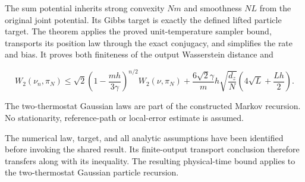 \documentclass[11pt,a4paper]{article}
\begin{document}
The sum potential inherits strong convexity \(Nm\) and smoothness \(NL\) from the original joint potential. Its Gibbs target is exactly the defined lifted particle target. The theorem applies the proved unit-temperature sampler bound, transports its position law through the exact conjugacy, and simplifies the rate and bias. It proves both finiteness of the output Wasserstein distance and

\[W_2(\nu_n,\pi_N)\le\sqrt2\left(1-\frac{mh}{3\gamma}\right)^{n/2}W_2(\nu,\pi_N)+\frac{6\sqrt2\gamma}{m}h\sqrt{\frac{d_z}{N}}\left(4\sqrt L+\frac{Lh}{2}\right).\]

The two-thermostat Gaussian laws are part of the constructed Markov recursion. No stationarity, reference-path or local-error estimate is assumed.



The numerical law, target, and all analytic assumptions have been identified before invoking the shared result. Its finite-output transport conclusion therefore transfers along with its inequality. The resulting physical-time bound applies to the two-thermostat Gaussian particle recursion.
\end{document}
